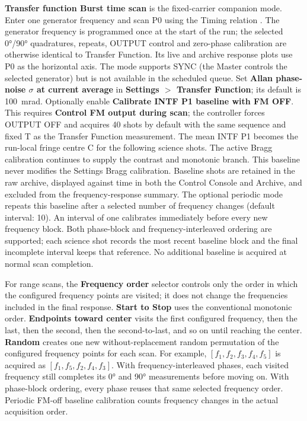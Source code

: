 \documentclass[11pt,oneside,openany]{book}
\newcommand{\code}[1]{\texttt{\detokenize{#1}}}
\newcommand{\ui}[1]{\textbf{#1}}
\begin{document}
\ui{Transfer function Burst time scan} is the fixed-carrier companion mode. Enter one
generator frequency and scan P0 using the Timing relation \code{[P0, Total-P0]}. The generator
frequency is programmed once at the start of the run; the selected \ang{0}/\ang{90}
quadratures, repeats, OUTPUT control and zero-phase calibration are otherwise identical
to Transfer Function. Its live and archive response plots use P0 as the horizontal axis.
The mode supports SYNC (the Master controls the selected generator) but is not available in the scheduled
queue.
Set \ui{Allan phase-noise $\sigma$ at current average} in
\ui{Settings $>$ Transfer Function}; its default is \SI{100}{\milli\radian}.
Optionally enable \ui{Calibrate INTF P1 baseline with FM OFF}. This requires
\ui{Control FM output during scan}; the controller forces OUTPUT OFF and acquires 40 shots
by default with the same sequence and fixed T as the Transfer Function measurement. The
mean INTF P1 becomes the run-local fringe centre C for the following science shots. The
active Bragg calibration continues to supply the contrast and monotonic branch. This
baseline never modifies the Settings Bragg calibration. Baseline shots are retained in
the raw archive, displayed against time in both the Control Console and Archive, and
excluded from the frequency-response summary.
The optional periodic mode repeats this baseline after a selected number of frequency
changes (default interval: 10). An interval of one calibrates immediately before every
new frequency block. Both phase-block and frequency-interleaved ordering are supported;
each science shot records the most recent baseline block and the final incomplete interval
keeps that reference. No additional baseline is acquired at normal scan completion.

For range scans, the \ui{Frequency order} selector controls only the order in which the configured
frequency points are visited; it does not change the frequencies included in the final
response. \ui{Start to Stop} uses the conventional monotonic order. \ui{Endpoints toward
center} visits the first configured frequency, then the last, then the second, then the
second-to-last, and so on until reaching the center. \ui{Random} creates one new
without-replacement random permutation of the configured frequency points for each scan.
For example,
\( [f_1,f_2,f_3,f_4,f_5] \) is acquired as
\( [f_1,f_5,f_2,f_4,f_3] \). With frequency-interleaved phases, each visited frequency
still completes its \ang{0} and \ang{90} measurements before moving on. With phase-block
ordering, every phase reuses that same selected frequency order. Periodic FM-off baseline
calibration counts frequency changes in the actual acquisition order.
\end{document}
